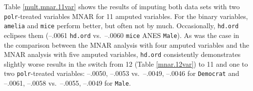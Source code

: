 \documentclass[12pt,econ]{sources/authesis}
\begin{document}
Table \ref{mult.mnar.11var} shows the results of imputing both data sets with two \texttt{polr}-treated variables MNAR for 11 amputed variables. For the binary variables, \texttt{amelia} and \texttt{mice} perform better, but often not by much. Occasionally, \texttt{hd.ord} eclipses them (--.0061 \texttt{hd.ord} vs.~--.0060 \texttt{mice} ANES \texttt{Male}). As was the case in the comparison between the MNAR analysis with four amputed variables and the MNAR analysis with five amputed variables, \texttt{hd.ord} consistently demonstrates slightly worse results in the switch from 12 (Table \ref{mnar.12var}) to 11 and one to two \texttt{polr}-treated variables: --.0050, --.0053 vs.~--.0049, --.0046 for \texttt{Democrat} and --.0061, --.0058 vs.~--.0055, --.0049 for \texttt{Male}.

\ssp
\end{document}

